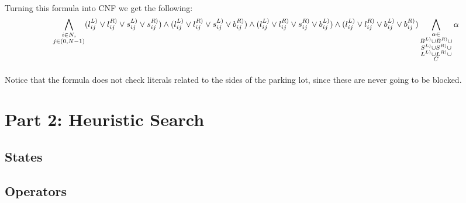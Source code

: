 \paragraph{}
Turning this formula into CNF we get the following:
\begin{equation}
  \bigwedge_{\substack{i \in N,\\ j \in (0, N-1)}}
  (l^{L)}_{ij} \lor l^{R)}_{ij} \lor s^{L)}_{ij} \lor s^{R)}_{ij}) \land
  (l^{L)}_{ij} \lor l^{R)}_{ij} \lor s^{L)}_{ij} \lor b^{R)}_{ij}) \land
  (l^{L)}_{ij} \lor l^{R)}_{ij} \lor s^{R)}_{ij} \lor b^{L)}_{ij}) \land
  (l^{L)}_{ij} \lor l^{R)}_{ij} \lor b^{L)}_{ij} \lor b^{R)}_{ij})
  \bigwedge_{\substack{
      \alpha \in\\
      B^{L)} \cup
      B^{R)} \cup \\
      S^{L)} \cup
      S^{R)} \cup \\
      L^{L)} \cup
      L^{R)} \cup \\
      C
    }}
    \alpha
\end{equation}

\paragraph{}
Notice that the formula does not check literals related to the sides of the parking lot, since these are never going to be blocked.


\section{Part 2: Heuristic Search}

\subsection{States}

\paragraph{}

\subsection{Operators}

\paragraph{}

